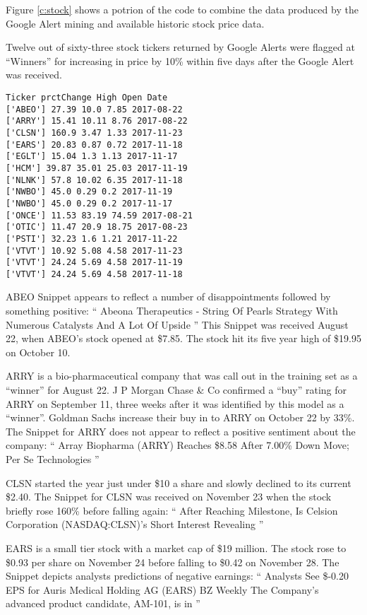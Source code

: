 \documentclass[sigconf]{acmart}
\begin{document}
Figure \ref{c:stock} shows a potrion of the code to combine the data produced by the Google Alert mining and available historic stock price data.

Twelve out of sixty-three stock tickers returned by Google Alerts were flagged at ``Winners'' for increasing in price by 10\% within five days after the Google Alert was received. 
\begin{verbatim}
Ticker prctChange High Open Date
['ABEO'] 27.39 10.0 7.85 2017-08-22
['ARRY'] 15.41 10.11 8.76 2017-08-22
['CLSN'] 160.9 3.47 1.33 2017-11-23
['EARS'] 20.83 0.87 0.72 2017-11-18
['EGLT'] 15.04 1.3 1.13 2017-11-17
['HCM'] 39.87 35.01 25.03 2017-11-19
['NLNK'] 57.8 10.02 6.35 2017-11-18
['NWBO'] 45.0 0.29 0.2 2017-11-19
['NWBO'] 45.0 0.29 0.2 2017-11-17
['ONCE'] 11.53 83.19 74.59 2017-08-21
['OTIC'] 11.47 20.9 18.75 2017-08-23
['PSTI'] 32.23 1.6 1.21 2017-11-22
['VTVT'] 10.92 5.08 4.58 2017-11-23
['VTVT'] 24.24 5.69 4.58 2017-11-19
['VTVT'] 24.24 5.69 4.58 2017-11-18
\end{verbatim}

ABEO Snippet appears to reflect a number of disappointments followed by something positive:
``
Abeona Therapeutics - String Of Pearls Strategy With Numerous Catalysts And A Lot Of Upside
''
This Snippet was received August 22, when ABEO's stock opened at \$7.85. The stock hit its five year high of \$19.95 on October 10. 

ARRY is a bio-pharmaceutical company that was call out in the training set as a ``winner'' for August 22. J P Morgan Chase \& Co confirmed a ``buy'' rating for ARRY on September 11, three weeks after it was identified by this model as a ``winner''. Goldman Sachs increase their buy in to ARRY  on October 22 by 33\%. The Snippet for ARRY does not appear to reflect a positive sentiment about the company:
``
Array Biopharma (ARRY) Reaches \$8.58 After 7.00\% Down Move; Per Se Technologies
''

CLSN started the year just under \$10 a share and slowly declined to its current \$2.40. The Snippet for CLSN was received on November 23 when the stock briefly rose 160\% before falling again:
``
After Reaching Milestone, Is Celsion Corporation (NASDAQ:CLSN)'s Short Interest Revealing
''

EARS is a small tier stock with a market cap of \$19 million. The stock rose to \$0.93 per share on November 24 before falling to \$0.42 on November 28. The Snippet depicts analysts predictions of negative earnings:
``
Analysts See \$-0.20 EPS for Auris Medical Holding AG (EARS) BZ Weekly The Company's advanced product candidate, AM-101, is in
''
\end{document}
